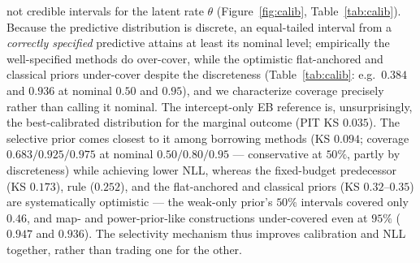 \documentclass[11pt]{article}
\begin{document}
not credible intervals for the latent rate $\theta$
(Figure~\ref{fig:calib}, Table~\ref{tab:calib}). Because the predictive
distribution is discrete, an equal-tailed interval from a \emph{correctly
specified} predictive attains at least its nominal level; empirically the
well-specified methods do over-cover, while the optimistic flat-anchored and
classical priors under-cover despite the discreteness (Table~\ref{tab:calib}:
e.g.\ $0.384$ and $0.936$ at nominal $0.50$ and $0.95$), and we characterize
coverage precisely rather than calling it nominal. The
intercept-only EB reference is, unsurprisingly, the best-calibrated
distribution for the marginal outcome (PIT KS $0.035$). The selective prior
comes closest to it among borrowing methods (KS $0.094$; coverage
$0.683/0.925/0.975$ at nominal $0.50/0.80/0.95$ --- conservative at $50\%$,
partly by discreteness) while achieving lower NLL, whereas the fixed-budget
predecessor (KS $0.173$), rule ($0.252$), and the flat-anchored and classical
priors (KS $0.32$--$0.35$) are systematically optimistic --- the weak-only
prior's $50\%$ intervals covered only $0.46$, and map- and power-prior-like
constructions under-covered even at $95\%$ ($0.947$ and $0.936$). The
selectivity mechanism thus improves calibration and NLL together, rather than
trading one for the other.
\end{document}
